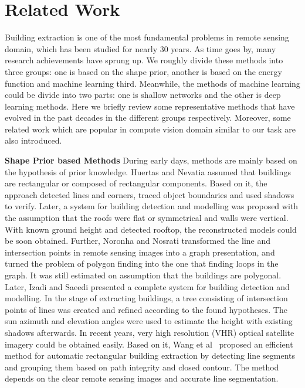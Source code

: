 \section{Related Work}
\label{Sec:RelatedWork}


Building extraction is one of the most fundamental problems in remote sensing domain, which has been studied for nearly 30 years.
As time goes by, many research achievements have sprung up.
We roughly divide these methods into three groups: one is based on the shape prior, another is based on the energy function and machine learning third. Meanwhile, the methods of machine learning could be divide into two parts: one is shallow networks and the other is deep learning methods.
Here we briefly review some representative methods that have evolved in the past decades in the different groups respectively.
Moreover, some related work which are popular in compute vision domain similar to our task are also introduced.



\textbf{Shape Prior based Methods} During early days, methods are mainly based on the hypothesis of prior knowledge.
Huertas and Nevatia \cite{IEEEexample:huertas1988detecting} assumed that buildings are rectangular or composed of rectangular components.
Based on it, the approach detected lines and corners, traced object boundaries and used shadows to verify.
Later, a system \cite{IEEEexample:noronha2001detection} for building detection and modelling was proposed with the assumption that the roofs were flat or symmetrical and walls were vertical.
With known ground height and detected rooftop, the reconstructed models could be soon obtained.
Further, Noronha and Nosrati \cite{IEEEexample:nosrati2009novel} transformed the line and intersection points in remote sensing images into a graph presentation, and turned the problem of polygon finding into the one that finding loops in the graph.
It was still estimated on assumption that the buildings are polygonal.
Later, Izadi and Saeedi\cite{IEEEexample:izadi2012three} presented a complete system for building detection and modelling.
In the stage of extracting buildings, a tree consisting of intersection points of lines was created and refined according to the found hypotheses.
The sun azimuth and elevation angles were used to estimate the height with existing shadows afterwards.
In recent years, very high resolution (VHR) optical satellite imagery could be obtained easily.
Based on it, Wang et al~\cite{IEEEexample:wang2015efficient} proposed an efficient method for automatic rectangular building extraction by detecting line segments and grouping them based on path integrity and closed contour. The method depends on the clear remote sensing images and accurate line segmentation.


